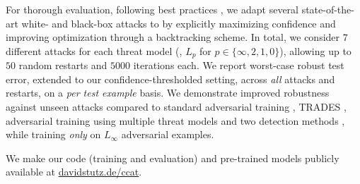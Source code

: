 For thorough evaluation, following best practices \cite{CarliniARXIV2019}, we adapt several state-of-the-art white- and black-box attacks \cite{MadryICLR2018,IlyasICML2018,AndriushchenkoARXIV2019,NarodytskaCVPRWORK2017,KhouryARXIV2018} to \ConfTrain by explicitly maximizing confidence and improving optimization through a backtracking scheme. In total, we consider $7$ different attacks for each threat model (\ie, $L_p$ for $p \in \{\infty, 2, 1, 0\}$), allowing up to $50$ random restarts and $5000$ iterations each. We report worst-case robust test error, extended to our confidence-thresholded setting, across \emph{all} attacks and restarts, on a \emph{per test example} basis. We demonstrate improved robustness against unseen attacks compared to standard adversarial training \cite{MadryICLR2018}, TRADES \cite{ZhangICML2019}, adversarial training using multiple threat models \cite{MainiICML2020} and two detection methods \cite{MaICLR2018,LeeNIPS2018}, while training \emph{only} on $L_\infty$ adversarial examples.

We make our code (training and evaluation) and pre-trained models publicly available at \href{http://davidstutz.de/ccat}{davidstutz.de/ccat}.